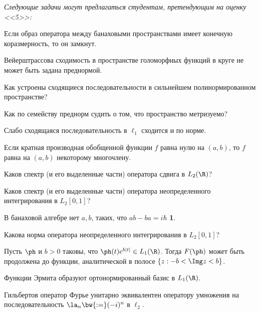\documentclass[a4paper]{article}
\begin{document}
{\it Следующие задачи могут предлагаться студентам, претендующим на оценку <<5>>:}

\begin{nums}{-1}
\item Если образ оператора между банаховыми пространствами имеет конечную коразмерность, то он замкнут.

\item Вейерштрассова сходимость в пространстве голоморфных функций в круге не может быть задана преднормой.
\item Как устроены сходящиеся последовательности в сильнейшем полинормированном пространстве?

\item Как по семейству преднорм судить о том, что пространство метризуемо?
\item Слабо сходящаяся последовательность в $\ell_1$ сходится и по норме.

\item Если кратная производная обобщенной функции $f$ равна нулю на $(a,b)$,
то $f$ равна на $(a,b)$ некоторому многочлену.
\item Каков спектр (и его выделенные части) оператора сдвига в $L_2(\R)$?

\item Каков спектр (и его выделенные части) оператора неопределенного
интегрирования в $L_2[0,1]$?
\item В банаховой алгебре нет $a,b$, таких, что $ab-ba=i\hbar$ {\bf 1}.

\item Какова норма оператора неопределенного интегрирования в $L_2[0,1]$?
\item Пусть $\ph$ и $b>0$ таковы, что $\ph(t)e^{b|t|}\in L_1(\R)$. Тогда
$F(\ph)$ может быть продолжена до функции, аналитической в полосе $\{z: -b<\Img z<b\}$.

\item Функции Эрмита образуют ортонормированный базис в $L_1(\R)$.
\item Гильбертов оператор Фурье унитарно эквивалентен оператору умножения
на последовательность $\la_n\bw{:=}(-i)^n$ в $\ell_2$.
\end{nums}
\end{document}
